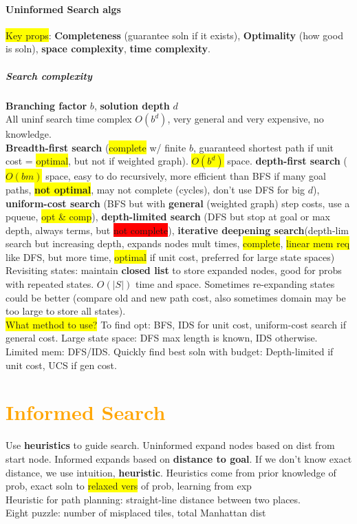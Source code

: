 \paragraph{Uninformed Search algs}
\colorbox{yellow}{Key props}:  \textbf{Completeness} (guarantee soln if it exists),
\textbf{Optimality} (how good is soln), \textbf{space complexity},
\textbf{time complexity}.
\subparagraph{Search complexity} \textbf{Branching factor} $b$,
\textbf{solution depth} $d$
\\ All uninf search time complex $O(b^d)$, very general and very
expensive, no knowledge.
\\ \textbf{Breadth-first search} (\colorbox{yellow}{complete} w/ finite $b$, guaranteed
shortest path if unit cost = \colorbox{yellow}{optimal}, but not if
weighted graph). \colorbox{yellow}{$O(b^d)$} space. \textbf{depth-first
  search} (\colorbox{yellow}{$O(bm)$} space, easy to do recursively, more efficient than
BFS if many goal paths, \colorbox{yellow}{\textbf{not optimal}}, may not complete
(cycles), don't use DFS for big $d$), \textbf{uniform-cost search}
(BFS but with \textbf{general} (weighted graph) step costs, use a
pqueue, \colorbox{yellow}{opt \& comp}), \textbf{depth-limited search} (DFS but stop at goal or max
depth, always terms, but \colorbox{red}{not complete}),
\textbf{iterative deepening search}(depth-lim search but increasing
depth, expands nodes mult times, \colorbox{yellow}{complete}, \colorbox{yellow}{linear mem req} like DFS,
but more time, \colorbox{yellow}{optimal} if unit cost, preferred for large state spaces)
\\ Revisiting states: maintain \textbf{closed list} to store expanded
nodes, good for probs with repeated states. $O(|S|)$ time and
space. Sometimes re-expanding states could be better (compare old and
new path cost, also sometimes domain may be too large to store all
states).
\\ \colorbox{yellow}{What method to use?} To find opt: BFS, IDS for unit cost,
uniform-cost search if general cost. Large state space: DFS max length
is known, IDS otherwise. Limited mem: DFS/IDS. Quickly find best soln
with budget: Depth-limited if unit cost, UCS if gen cost.
\color{Orange}
\section{\textcolor{Orange}{Informed Search}} Use \textbf{heuristics} to guide search. Uninformed
expand nodes based on dist from start node. Informed expands based on
\textbf{distance to goal}. If we don't know exact distance, we use
intuition, \textbf{heuristic}. Heuristics come from prior knowledge of
prob, exact soln to \colorbox{yellow}{relaxed vers} of prob, learning from exp
\\ Heuristic for path planning: straight-line distance between two places.
\\ Eight puzzle: number of misplaced tiles, total Manhattan dist
